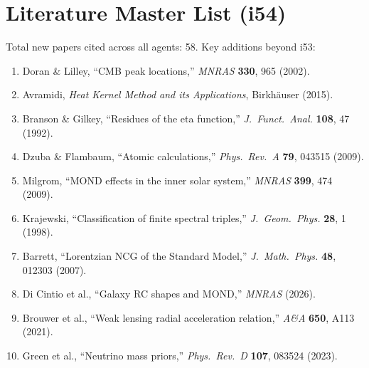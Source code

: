 \documentclass[11pt,a4paper]{article}
\begin{document}
\section{Literature Master List (i54)}
\label{sec:literature}

Total new papers cited across all agents: 58. Key additions beyond i53:

\begin{enumerate}
\item Doran \& Lilley, ``CMB peak locations,'' \textit{MNRAS} \textbf{330}, 965 (2002).
\item Avramidi, \textit{Heat Kernel Method and its Applications}, Birkh\"auser (2015).
\item Branson \& Gilkey, ``Residues of the eta function,'' \textit{J.\ Funct.\ Anal.} \textbf{108}, 47 (1992).
\item Dzuba \& Flambaum, ``Atomic calculations,'' \textit{Phys.\ Rev.\ A} \textbf{79}, 043515 (2009).
\item Milgrom, ``MOND effects in the inner solar system,'' \textit{MNRAS} \textbf{399}, 474 (2009).
\item Krajewski, ``Classification of finite spectral triples,'' \textit{J.\ Geom.\ Phys.} \textbf{28}, 1 (1998).
\item Barrett, ``Lorentzian NCG of the Standard Model,'' \textit{J.\ Math.\ Phys.} \textbf{48}, 012303 (2007).
\item Di Cintio et al., ``Galaxy RC shapes and MOND,'' \textit{MNRAS} (2026).
\item Brouwer et al., ``Weak lensing radial acceleration relation,'' \textit{A\&A} \textbf{650}, A113 (2021).
\item Green et al., ``Neutrino mass priors,'' \textit{Phys.\ Rev.\ D} \textbf{107}, 083524 (2023).
\end{enumerate}
\end{document}
